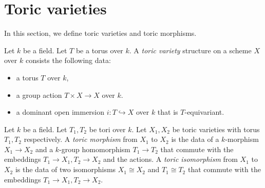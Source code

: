 \section{Toric varieties}


In this section, we define toric varieties and toric morphisms.


\begin{definition}
  \label{5-1-tor-var}
  \leanok

  Let $k$ be a field.
  Let $T$ be a torus over $k$.
  A \emph{toric variety} structure on a scheme $X$ over $k$ consists the following data:
  \begin{itemize}
    \item a torus $T$ over $k$,
    \item a group action $T \times X \to X$ over $k$.
    \item a dominant open immersion $i : T \hookrightarrow X$ over $k$ that is $T$-equivariant.
  \end{itemize}
\end{definition}


\begin{definition}
  \label{5-1-tor-hom}
  \leanok

  Let $k$ be a field.
  Let $T_1, T_2$ be tori over $k$.
  Let $X_1, X_2$ be toric varieties with torus $T_1, T_2$ respectively.
  A \emph{toric morphism} from $X_1$ to $X_2$ is the data of a $k$-morphism $X_1 \to X_2$
  and a $k$-group homomorphism $T_1 \to T_2$ that commute
  with the embeddings $T_1 \to X_1, T_2 \to X_2$ and the actions.
  A \emph{toric isomorphism} from $X_1$ to $X_2$ is the data of two isomorphisms $X_1 \cong X_2$ and
  $T_1 \cong T_2$ that commute with the embeddings $T_1 \to X_1, T_2 \to X_2$.
\end{definition}
